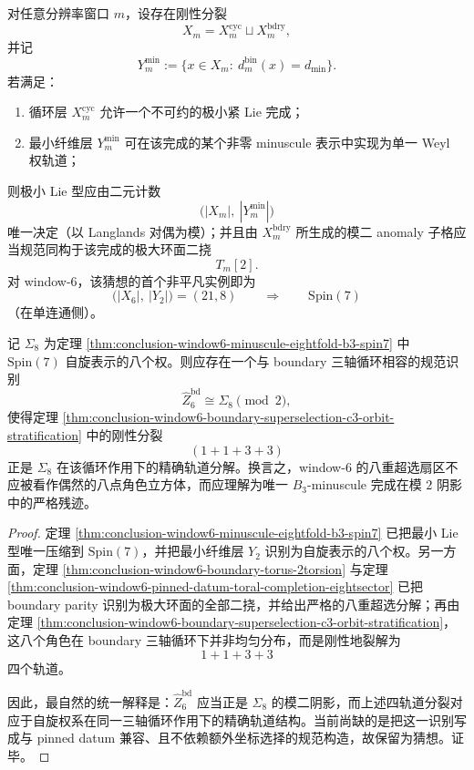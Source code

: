 \begin{conjecture}\label{conj:conclusion-minuscule-boundary-rigidity}
对任意分辨率窗口 \(m\)，设存在刚性分裂
\[
X_m=X_m^{\mathrm{cyc}}\sqcup X_m^{\mathrm{bdry}},
\]
并记
\[
Y_m^{\min}:=\{x\in X_m:\ d_m^{\mathrm{bin}}(x)=d_{\min}\}.
\]
若满足：
\begin{enumerate}
  \item 循环层 \(X_m^{\mathrm{cyc}}\) 允许一个不可约的极小紧 Lie 完成；
  \item 最小纤维层 \(Y_m^{\min}\) 可在该完成的某个非零 minuscule 表示中实现为单一 Weyl 权轨道；
\end{enumerate}
则极小 Lie 型应由二元计数
\[
\bigl(|X_m|,\ |Y_m^{\min}|\bigr)
\]
唯一决定（以 Langlands 对偶为模）；并且由 \(X_m^{\mathrm{bdry}}\) 所生成的模二 anomaly 子格应当规范同构于该完成的极大环面二挠
\[
T_m[2].
\]
对 window-\(6\)，该猜想的首个非平凡实例即为
\[
\bigl(|X_6|,\ |Y_2|\bigr)=(21,8)
\qquad\Longrightarrow\qquad
\mathrm{Spin}(7)
\]
（在单连通侧）。
\end{conjecture}

\begin{conjecture}\label{conj:conclusion-window6-boundary-superselection-spin7-mod2-shadow}
记 \(\Sigma_8\) 为定理 \ref{thm:conclusion-window6-minuscule-eightfold-b3-spin7} 中 \(\mathrm{Spin}(7)\) 自旋表示的八个权。则应存在一个与 boundary 三轴循环相容的规范识别
\[
\widehat Z_6^{\mathrm{bd}}
\cong
\Sigma_8 \pmod 2,
\]
使得定理 \ref{thm:conclusion-window6-boundary-superselection-c3-orbit-stratification} 中的刚性分裂
\[
(1+1+3+3)
\]
正是 \(\Sigma_8\) 在该循环作用下的精确轨道分解。换言之，window-\(6\) 的八重超选扇区不应被看作偶然的八点角色立方体，而应理解为唯一 \(B_3\)-minuscule 完成在模 \(2\) 阴影中的严格残迹。
\end{conjecture}
\begin{proof}
定理 \ref{thm:conclusion-window6-minuscule-eightfold-b3-spin7} 已把最小 Lie 型唯一压缩到 \(\mathrm{Spin}(7)\)，并把最小纤维层 \(Y_2\) 识别为自旋表示的八个权。另一方面，定理 \ref{thm:conclusion-window6-boundary-torus-2torsion} 与定理 \ref{thm:conclusion-window6-pinned-datum-toral-completion-eightsector} 已把 boundary parity 识别为极大环面的全部二挠，并给出严格的八重超选分解；再由定理 \ref{thm:conclusion-window6-boundary-superselection-c3-orbit-stratification}，这八个角色在 boundary 三轴循环下并非均匀分布，而是刚性地裂解为
\[
1+1+3+3
\]
四个轨道。

因此，最自然的统一解释是：\(\widehat Z_6^{\mathrm{bd}}\) 应当正是 \(\Sigma_8\) 的模二阴影，而上述四轨道分裂对应于自旋权系在同一三轴循环作用下的精确轨道结构。当前尚缺的是把这一识别写成与 pinned datum 兼容、且不依赖额外坐标选择的规范构造，故保留为猜想。证毕。
\end{proof}

